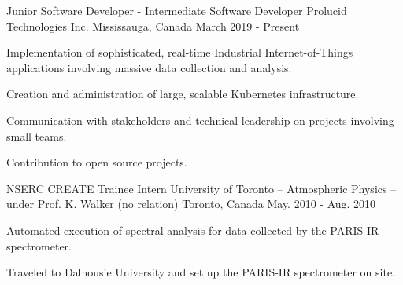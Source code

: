 

\begin{cventries}

  \cventry
    {Junior Software Developer - Intermediate Software Developer}
    {Prolucid Technologies Inc.}    
    {Mississauga, Canada}
    {March 2019 - Present}
    {
      \begin{cvitems}
        \item{Implementation of sophisticated, real-time Industrial Internet-of-Things applications involving massive data collection and analysis.}
        \item{Creation and administration of large, scalable Kubernetes infrastructure.}
        \item{Communication with stakeholders and technical leadership on projects involving small teams.}
        \item{Contribution to open source projects.}
      \end{cvitems}
    }
    

  \cventry
    {NSERC CREATE Trainee Intern} %
    {University of Toronto -- Atmospheric Physics -- under Prof. K. Walker (no relation)} %
    {Toronto, Canada} %
    {May. 2010 - Aug. 2010} %
    {
      \begin{cvitems} %
        \item{Automated execution of spectral analysis for data collected by the
            PARIS-IR spectrometer.}
        \item{Traveled to Dalhousie University and set up the PARIS-IR
            spectrometer on site.}
      \end{cvitems}
    }


\end{cventries}
